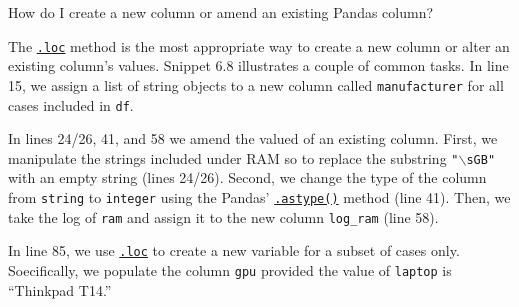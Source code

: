 \documentclass[a4paper,11pt]{book}
\numberwithin{figure}{chapter}
\numberwithin{table}{chapter}
\newcommand{\question}[1]{%
    \begin{tcolorbox}[colback=comp_c!10,colframe=comp_c,sidebyside align=top,width=\linewidth,before skip=1ex]
        #1
    \end{tcolorbox}
    \switchcolumn%
}
\newcommand{\note}[1]{%
    \begin{tcolorbox}[colback=white!0,colframe=white!10,width=\linewidth,before skip=1ex]
        #1
    \end{tcolorbox}
}
\begin{document}
\begin{paracol}{2}
	\question{\raggedright How do I create a new column or amend an existing Pandas column?}
	\note{The \href{https://pandas.pydata.org/docs/reference/api/pandas.DataFrame.loc.html?highlight=loc#pandas.DataFrame.loc}{\texttt{.loc}} method is the most appropriate way to create a new column or alter an existing column's values. Snippet 6.8 illustrates a couple of common tasks. In line 15, we assign a list of string objects to a new column called \texttt{manufacturer} for all cases included in \texttt{df}. 
	
	\quad In lines 24/26, 41, and 58 we amend the valued of an existing column. First, we manipulate the strings included under RAM so to replace the substring \texttt{"$\backslash$sGB"} with an empty string (lines 24/26). Second, we change the type of the column from \texttt{string} to \texttt{integer} using the Pandas' \href{https://pandas.pydata.org/docs/reference/api/pandas.DataFrame.astype.html?highlight=astype#pandas.DataFrame.astype}{\texttt{.astype()}} method (line 41). Then, we take the log of \texttt{ram} and assign it to the new column \texttt{log\_ram} (line 58). 
	
	\quad In line 85, we use \href{https://pandas.pydata.org/docs/reference/api/pandas.DataFrame.loc.html?highlight=loc#pandas.DataFrame.loc}{\texttt{.loc}} to create a new variable for a subset of cases only. Soecifically, we populate the column \texttt{gpu} provided the value of \texttt{laptop} is ``Thinkpad T14.''
	}
\end{paracol}
\end{document}
